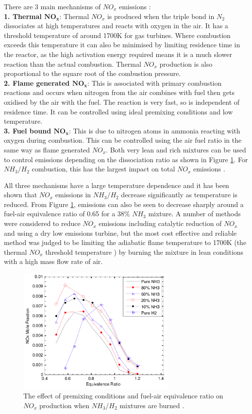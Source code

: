 There are 3 main mechanisms of $NO_x$ emissions \cite{netl}:\\ 
\textbf{1. Thermal $\mathbf{NO_x}$}: Thermal $NO_x$ is produced when the triple bond in $N_2$ dissociates at high temperatures and reacts with oxygen in the air. It has a threshold temperature of around 1700K for gas turbines. Where combustion exceeds this temperature it can also be minimised by limiting residence time in the reactor, as the high activation energy required means it is a much slower reaction than the actual combustion. Thermal $NO_x$ production is also proportional to the square root of the combustion pressure.
\\\textbf{2. Flame generated $\mathbf{NO_x}$}: This is associated with primary combustion reactions and occurs when nitrogen from the air combines with fuel then gets oxidised by the air with the fuel. The reaction is very fast, so is independent of residence time. It can be controlled using ideal premixing conditions and low temperature.
\\\textbf{3. Fuel bound $\mathbf{NO_x}$}: This is due to nitrogen atoms in ammonia reacting with oxygen during combustion. This can be controlled using the air fuel ratio in the same way as flame generated $NO_x$. Both very lean and rich mixtures can be used to control emissions depending on the dissociation ratio as shown in Figure \ref{fig:NOxemissions}. For $NH_3/H_2$ combustion, this has the largest impact on total $NO_x$ emissions \cite{junLi}. 
  
All three mechanisms have a large temperature dependence and it has been shown that $NO_x$ emissions in $NH_3/H_2$ decrease significantly as temperature is reduced. From Figure \ref{fig:NOxemissions}, emissions can also be seen to decrease sharply around a fuel-air equivalence ratio of 0.65 for a $38\%$ $NH_3$ mixture. A number of methods were considered to reduce $NO_x$ emissions including catalytic reduction of $NO_x$ and using a dry low emissions turbine, but the most cost effective and reliable method was judged to be limiting the adiabatic flame temperature to 1700K (the thermal $NO_x$ threshold temperature \cite{netl}) by burning the mixture in lean conditions with a high mass flow rate of air.

\begin{figure} [h]
\centering
\includegraphics[width=0.7\textwidth]{./pictures/NOxhighres.png}
  \caption{The effect of premixing conditions and fuel-air equivalence ratio on $NO_x$ production when $NH_3/H_2$ mixtures are burned \cite{Nozari2015}.} \label{fig:NOxemissions}
  \end{figure}
